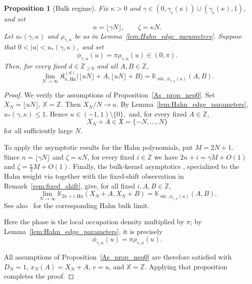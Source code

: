 \documentclass[reqno,11pt]{amsart}
\newcommand{\ZZ}{\mathbb{Z}}
\theoremstyle{plain}
\newtheorem{prop}[thm]{Proposition}
\theoremstyle{definition}
\numberwithin{equation}{section}
\begin{document}
\begin{prop}[Bulk regime]\label{prop:hahn_bulk}
Fix \(\kappa>0\) and
$\gamma\in
\left(0,\gamma_{\mathrm c}(\kappa)\right)\cup
\left(\gamma_{\mathrm c}(\kappa),1\right)$,
and set
\[
n=\lfloor\gamma N\rfloor,
\qquad
\zeta=\kappa N.
\]
Let \(u_{\ast}(\gamma,\kappa)\) and
\(\rho_{\gamma,\kappa}\) be as in
Lemma~\ref{lem:Hahn_edge_parameters}. Suppose that
$
0<|u|<u_{\ast}(\gamma,\kappa),
$
and set
\[
\phi_{\gamma,\kappa}(u)
=
\pi\rho_{\gamma,\kappa}(u)
\in(0,\pi).
\]
Then, for every fixed \(d\in\ZZ_{\geq0}\) and all
\(A,B\in\ZZ\),
\[
\lim_{N\to\infty}
\mathfrak K^{(d)}_{n,\mathrm{Hn}}
\bigl(
\lfloor uN\rfloor+A,
\lfloor uN\rfloor+B
\bigr)
=
\mathbb K_{\sin,\phi_{\gamma,\kappa}(u)}(A,B).
\]
\end{prop} 
\begin{proof}
We verify the assumptions of
Proposition~\ref{As_prop_neq0}. Set
$X_N=\lfloor uN\rfloor$, $\mathbb X=\ZZ$. Then
${X_N}/{N}\longrightarrow u$. By Lemma~\ref{lem:Hahn_edge_parameters},
\(u_{\ast}(\gamma,\kappa)\leq1\). Hence
$
u\in(-1,1)\setminus\{0\},
$
and, for every fixed \(A\in\ZZ\),
\[
X_N+A\in\mathfrak X=\{-N,\ldots,N\}
\]
for all sufficiently large \(N\).

To apply the asymptotic results for the Hahn polynomials, put $M=2N+1$.
Since $n=\lfloor\gamma N\rfloor$ and $\zeta=\kappa N$, for every fixed $i\in\ZZ$ we have $2n+i=\gamma M+O(1)$ and $\zeta=\frac{\kappa}{2}M+O(1)$. 
Finally, the bulk-kernel asymptotics
\cite[Lemma~7.13]{baik2007discrete}, specialized to the Hahn weight via \cite[\S2.4.2 and Theorem~2.17]{baik2007discrete} together with the fixed-shift observation in Remark~\ref{rem:fixed_shift}, give, for all fixed \(i,A,B\in\ZZ\),
\[
\lim_{N\to\infty}
\mathbb K_{2n+i,\mathrm{Hn}}
(X_N+A,X_N+B)
=
\mathbb K_{\sin,\phi_{\gamma,\kappa}(u)}(A,B).
\]
See also~\cite[Theorem~1]{Gorin2008} for the corresponding Hahn bulk limit.

Here the phase is the local occupation density multiplied by
\(\pi\); by Lemma~\ref{lem:Hahn_edge_parameters}, it is precisely
\[
\phi_{\gamma,\kappa}(u)
=
\pi\rho_{\gamma,\kappa}(u).
\]

All assumptions of Proposition~\ref{As_prop_neq0} are
therefore satisfied with $D_N=1$, $x_N(A) = X_N+A$, $v=u$, and $\mathbb X=\ZZ$.
Applying that proposition completes the proof.
\end{proof}
\end{document}
